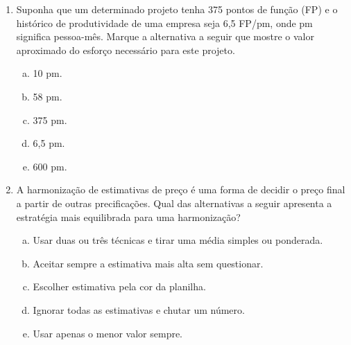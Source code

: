 \documentclass{beamer}
\begin{document}
\begin{frame}
    \begin{enumerate}
        \justifying
        \small
        \setcounter{enumi}{14}
        \item<1-2> Suponha que um determinado projeto tenha 375 pontos de função (FP) e o histórico de produtividade de uma empresa seja 6,5 FP/pm, onde pm significa pessoa-mês. Marque a alternativa a seguir que mostre o valor aproximado do esforço necessário para este projeto.
        \begin{enumerate}[a)]
            \justifying
            \footnotesize
            \item<1-2> 10 pm.
            \item<1-2> \alert<2>{58 pm}.
            \item<1-2> 375 pm.
            \item<1-2> 6,5 pm.
            \item<1-2> 600 pm.
        \end{enumerate}
        \item<3-4> A harmonização de estimativas de preço é uma forma de decidir o preço final a partir de outras precificações. Qual das alternativas a seguir apresenta a estratégia mais equilibrada para uma harmonização?
        \begin{enumerate}[a)]
            \justifying
            \footnotesize
            \item<3-4> \alert<4>{Usar duas ou três técnicas e tirar uma média simples ou ponderada}.
            \item<3-4> Aceitar sempre a estimativa mais alta sem questionar.
            \item<3-4> Escolher estimativa pela cor da planilha.
            \item<3-4> Ignorar todas as estimativas e chutar um número.
            \item<3-4> Usar apenas o menor valor sempre.
        \end{enumerate}
    \end{enumerate}
\end{frame}
\end{document}

